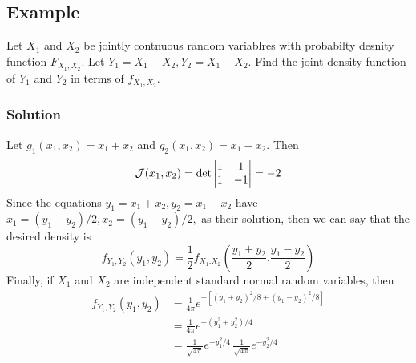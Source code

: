 \subsection*{Example}
Let $X_1$ and $X_2$ be jointly contnuous random variablres with probabilty desnity function $F_{X_1,X_2}$. Let $Y_1 = X_1 + X_2, Y_2 = X_1 - X_2$. Find the joint density function of $Y_1$ and $Y_2$ in terms of $f_{X_1,X_2}$.
\subsubsection*{Solution}
Let $g_1(x_1,x_2) = x_1 + x_2$ and $g_2(x_1,x_2) = x_1 - x_2$. Then \[\mathcal{J}(x_1,x_2) = \det\mdet{1&1\\1&-1\\} = -2\]
Since the equations $y_1 = x_1 + x_2, y_2 = x_1 - x_2$ have $x_1 = (y_1 + y_2)/2, x_2 = (y_1 - y_2)/2,$ as their solution, then we can say that the desired density is \[f_{Y_1,Y_2}(y_1,y_2) = \frac{1}{2}f_{X_1.X_2}\left(\frac{y_1+y_2}{2}. \frac{y_1-y_2}{2}\right)\]
Finally, if $X_1$ and $X_2$ are independent standard normal random variables, then 
\begin{equation*}
    \begin{split}
        f_{Y_1,Y_2}(y_1,y_2) &= \frac{1}{4\pi}e^{-[(y_1+y_2)^2/8 + (y_1-y_2)^2/8]}\\
        &= \frac{1}{4\pi}e^{-(y^2_1+y^2_2)/4}\\
        &= \frac{1}{\sqrt{4\pi}}e^{-y^2_1/4}\, \frac{1}{\sqrt{4\pi}}e^{-y^2_2/4}
    \end{split}
\end{equation*}
